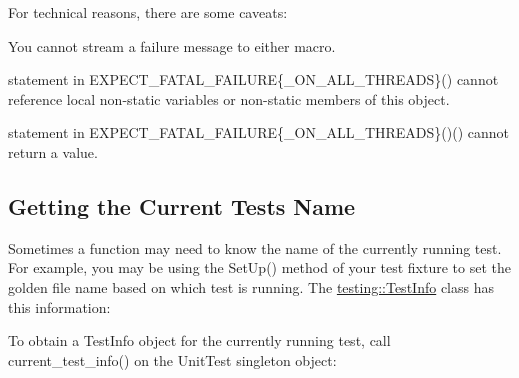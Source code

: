 For technical reasons, there are some caveats\+:


\begin{DoxyEnumerate}
\item You cannot stream a failure message to either macro.
\end{DoxyEnumerate}
\begin{DoxyEnumerate}
\item {\ttfamily statement} in {\ttfamily E\+X\+P\+E\+C\+T\+\_\+\+F\+A\+T\+A\+L\+\_\+\+F\+A\+I\+L\+U\+RE\{\+\_\+\+O\+N\+\_\+\+A\+L\+L\+\_\+\+T\+H\+R\+E\+A\+DS\}()} cannot reference local non-\/static variables or non-\/static members of {\ttfamily this} object.
\end{DoxyEnumerate}
\begin{DoxyEnumerate}
\item {\ttfamily statement} in {\ttfamily E\+X\+P\+E\+C\+T\+\_\+\+F\+A\+T\+A\+L\+\_\+\+F\+A\+I\+L\+U\+RE\{\+\_\+\+O\+N\+\_\+\+A\+L\+L\+\_\+\+T\+H\+R\+E\+A\+DS\}()()} cannot return a value.
\end{DoxyEnumerate}

\subsection*{Getting the Current Test\textquotesingle{}s Name}

Sometimes a function may need to know the name of the currently running test. For example, you may be using the {\ttfamily Set\+Up()} method of your test fixture to set the golden file name based on which test is running. The {\ttfamily \mbox{\hyperlink{classtesting_1_1TestInfo}{testing\+::\+Test\+Info}}} class has this information\+:


\begin{DoxyCode}{0}
\DoxyCodeLine{}
\DoxyCodeLine{  //}
\DoxyCodeLine{\};}
\DoxyCodeLine{}
\DoxyCodeLine{\}}
\end{DoxyCode}


To obtain a {\ttfamily Test\+Info} object for the currently running test, call {\ttfamily current\+\_\+test\+\_\+info()} on the {\ttfamily Unit\+Test} singleton object\+:


